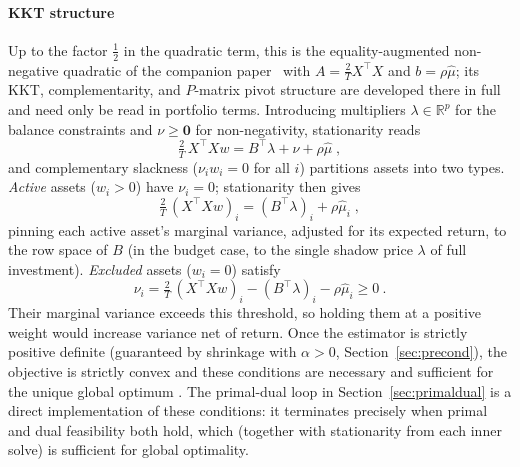 \paragraph{KKT structure}
Up to the factor $\tfrac{1}{2}$ in the quadratic term, this is the equality-augmented
non-negative quadratic of the companion paper~\cite{schmelzer2026nncg} with
$A = \tfrac{2}{T}X^\top X$ and $b = \rho\hat\mu$; its KKT, complementarity, and
$P$-matrix pivot structure are developed there in full and need only be read in
portfolio terms. Introducing multipliers $\lambda \in \mathbb{R}^p$ for the balance
constraints and $\nu \geq \mathbf{0}$ for non-negativity, stationarity reads
\[
\tfrac{2}{T}\, X^\top X w = B^\top\lambda+\nu+\rho\hat\mu\;,
\]
and complementary slackness ($\nu_i w_i = 0$ for all $i$) partitions assets
into two types. \emph{Active} assets ($w_i>0$) have $\nu_i=0$; stationarity then gives
\[
\tfrac{2}{T}\,(X^\top Xw)_i = (B^\top\lambda)_i+\rho\hat\mu_i\;,
\]
pinning each active asset's marginal variance, adjusted for its expected return, to the
row space of $B$ (in the budget case, to the single shadow price $\lambda$ of full
investment). \emph{Excluded} assets ($w_i=0$) satisfy
\[
\nu_i = \tfrac{2}{T}\,(X^\top Xw)_i - (B^\top\lambda)_i - \rho\hat\mu_i \geq 0~.
\]
Their marginal variance exceeds this threshold, so holding them at a positive weight would
increase variance net of return. Once the estimator is strictly positive definite
(guaranteed by shrinkage with $\alpha > 0$, Section~\ref{sec:precond}), the objective is
strictly convex and these conditions are necessary and sufficient for the unique global
optimum \cite[Section~2]{schmelzer2026nncg}. The primal-dual loop in
Section~\ref{sec:primaldual} is a direct
implementation of these conditions: it terminates precisely when primal and dual feasibility
both hold, which (together with stationarity from each inner solve) is sufficient for
global optimality.
